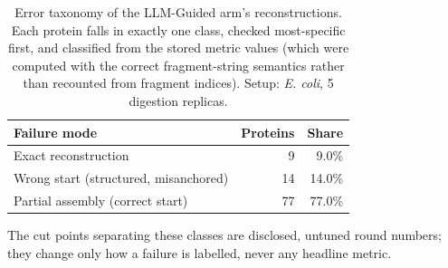 \begin{table}[!tb]
  \centering
  \caption{Error taxonomy of the LLM-Guided arm's reconstructions. Each protein falls in exactly one class, checked most-specific first, and classified from the stored metric values (which were computed with the correct fragment-string semantics rather than recounted from fragment indices). Setup: \textnormal{\textnormal{\textit{E. coli}}}, 5 digestion replicas.}
  \label{tab:error_taxonomy_ecoli_r5}
  \begin{tabular}{lrr}
    \toprule
    Failure mode & Proteins & Share \\
    \midrule
    Exact reconstruction & 9 & 9.0\% \\
    Wrong start (structured, misanchored) & 14 & 14.0\% \\
    Partial assembly (correct start) & 77 & 77.0\% \\
    \bottomrule
  \end{tabular}
  \par\smallskip\footnotesize{The cut points separating these classes are disclosed, untuned round numbers; they change only how a failure is labelled, never any headline metric.}
\end{table}
